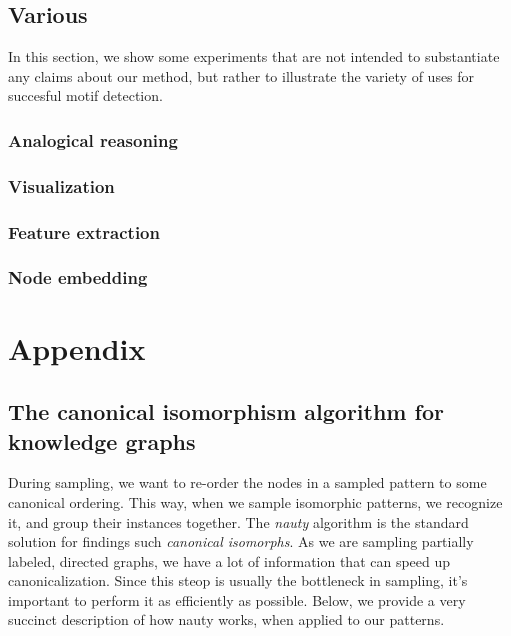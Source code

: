 \documentclass[11pt]{article}
\begin{document}
\subsection{Various}


In this section, we show some experiments that are not intended to substantiate any claims about our method, but rather to illustrate the variety of uses for succesful motif detection. 

\subsubsection{Analogical reasoning}

\subsubsection{Visualization}

\subsubsection{Feature extraction}

\subsubsection{Node embedding}



\appendix

\section{Appendix}

\subsection{The canonical isomorphism algorithm for knowledge graphs}

During sampling, we want to re-order the nodes in a sampled pattern to some canonical ordering. This way, when we sample isomorphic patterns, we recognize it, and group their instances together. The \emph{nauty} algorithm is the standard solution for findings such \emph{canonical isomorphs}. As we are sampling partially labeled, directed graphs, we have a lot of information that can speed up canonicalization. Since this steop is usually the bottleneck in sampling, it's important to perform it as efficiently as possible. Below, we provide a very succinct description of how nauty works, when applied to our patterns.
\end{document}

